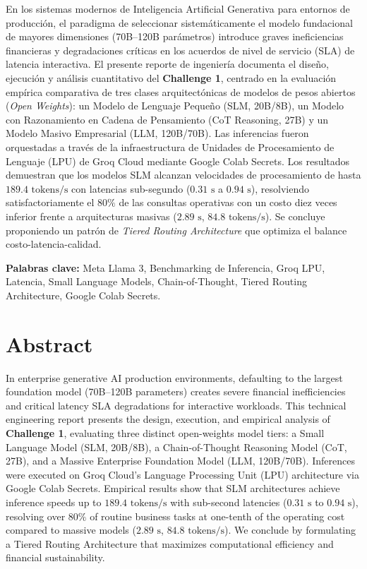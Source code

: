 \documentclass[12pt,letterpaper]{article}
\begin{document}
En los sistemas modernos de Inteligencia Artificial Generativa para entornos de producción, el paradigma de seleccionar sistemáticamente el modelo fundacional de mayores dimensiones (70B--120B parámetros) introduce graves ineficiencias financieras y degradaciones críticas en los acuerdos de nivel de servicio (SLA) de latencia interactiva. El presente reporte de ingeniería documenta el diseño, ejecución y análisis cuantitativo del \textbf{Challenge 1}, centrado en la evaluación empírica comparativa de tres clases arquitectónicas de modelos de pesos abiertos (\textit{Open Weights}): un Modelo de Lenguaje Pequeño (SLM, 20B/8B), un Modelo con Razonamiento en Cadena de Pensamiento (CoT Reasoning, 27B) y un Modelo Masivo Empresarial (LLM, 120B/70B). Las inferencias fueron orquestadas a través de la infraestructura de Unidades de Procesamiento de Lenguaje (LPU) de Groq Cloud mediante Google Colab Secrets. Los resultados demuestran que los modelos SLM alcanzan velocidades de procesamiento de hasta $189.4\text{ tokens/s}$ con latencias sub-segundo ($0.31\text{ s}$ a $0.94\text{ s}$), resolviendo satisfactoriamente el $80\%$ de las consultas operativas con un costo diez veces inferior frente a arquitecturas masivas ($2.89\text{ s}$, $84.8\text{ tokens/s}$). Se concluye proponiendo un patrón de \textit{Tiered Routing Architecture} que optimiza el balance costo-latencia-calidad.

\vspace{0.5cm}
\noindent\textbf{Palabras clave:} Meta Llama 3, Benchmarking de Inferencia, Groq LPU, Latencia, Small Language Models, Chain-of-Thought, Tiered Routing Architecture, Google Colab Secrets.

\vspace{1cm}

\section*{Abstract}

In enterprise generative AI production environments, defaulting to the largest foundation model (70B--120B parameters) creates severe financial inefficiencies and critical latency SLA degradations for interactive workloads. This technical engineering report presents the design, execution, and empirical analysis of \textbf{Challenge 1}, evaluating three distinct open-weights model tiers: a Small Language Model (SLM, 20B/8B), a Chain-of-Thought Reasoning Model (CoT, 27B), and a Massive Enterprise Foundation Model (LLM, 120B/70B). Inferences were executed on Groq Cloud's Language Processing Unit (LPU) architecture via Google Colab Secrets. Empirical results show that SLM architectures achieve inference speeds up to $189.4\text{ tokens/s}$ with sub-second latencies ($0.31\text{ s}$ to $0.94\text{ s}$), resolving over $80\%$ of routine business tasks at one-tenth of the operating cost compared to massive models ($2.89\text{ s}$, $84.8\text{ tokens/s}$). We conclude by formulating a Tiered Routing Architecture that maximizes computational efficiency and financial sustainability.
\end{document}
